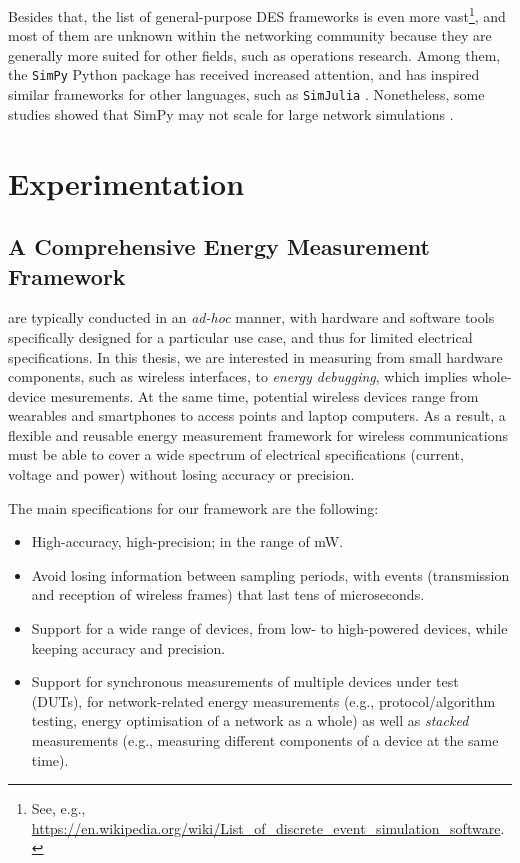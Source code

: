 \documentclass[twoside,nohyper]{tufte-book}
\providecommand{\tightlist}{%
  \setlength{\itemsep}{0pt}\setlength{\parskip}{0pt}}
\newcommand{\partseparator}{
  \noindent\leavevmode\leaders\hrule height 0.8ex depth \dimexpr0.4pt-0.8ex\hfill\kern0pt
  \newline~\vspace{-0.5\baselineskip}\newline}
\theoremstyle{definition}
\theoremstyle{definition}
\theoremstyle{definition}
\theoremstyle{remark}
\begin{document}
Besides that, the list of general-purpose DES frameworks is even more
vast\footnote{See, e.g.,
  \url{https://en.wikipedia.org/wiki/List_of_discrete_event_simulation_software}.},
and most of them are unknown within the networking community because
they are generally more suited for other fields, such as operations
research. Among them, the \texttt{SimPy} Python
package\cite[0pt]{SimPy}
has received increased attention, and has inspired similar frameworks
for other languages, such as \texttt{SimJulia} \citep{GitHub:SimJulia}.
Nonetheless, some studies showed that SimPy may not scale for large
network simulations \citep[\citet{weingartner2009}]{bahouth2007}.

\addtocontents{toc}{\partseparator}

\part{Experimentation}\label{part-experimentation}

\chapter{A Comprehensive Energy Measurement Framework}\label{ch:03}

 are typically conducted in an
\emph{ad-hoc} manner, with hardware and software tools specifically
designed for a particular use case, and thus for limited electrical
specifications. In this thesis, we are interested in measuring from
small hardware components, such as wireless interfaces, to \emph{energy
debugging}\cite[0pt]{Pathak2011},
which implies whole-device mesurements. At the same time, potential
wireless devices range from wearables and smartphones to access points
and laptop computers. As a result, a flexible and reusable energy
measurement framework for wireless communications must be able to cover
a wide spectrum of electrical specifications (current, voltage and
power) without losing accuracy or precision.

The main specifications for our framework are the following:

\begin{itemize}
\tightlist
\item
  High-accuracy, high-precision; in the range of mW.
\item
  Avoid losing information between sampling periods, with events
  (transmission and reception of wireless frames) that last tens of
  microseconds.
\item
  Support for a wide range of devices, from low- to high-powered
  devices, while keeping accuracy and precision.
\item
  Support for synchronous measurements of multiple devices under test
  (DUTs), for network-related energy measurements (e.g.,
  protocol/algorithm testing, energy optimisation of a network as a
  whole) as well as \emph{stacked} measurements (e.g., measuring
  different components of a device at the same time).
\end{itemize}
\end{document}
